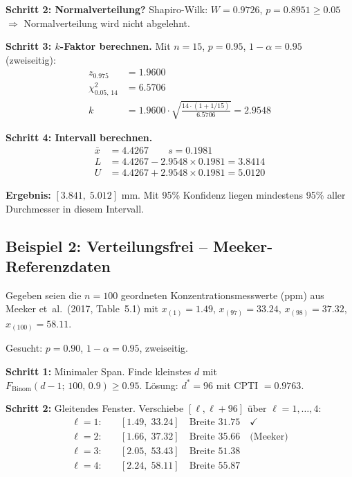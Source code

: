\documentclass[10pt,a4paper,twocolumn]{article}
\theoremstyle{definition}
\newcommand{\xbar}{\bar{x}}
\begin{document}
\textbf{Schritt 2: Normalverteilung?}
Shapiro-Wilk: $W = 0.9726$, $p = 0.8951 \geq 0.05$
$\Rightarrow$ Normalverteilung wird nicht abgelehnt.

\textbf{Schritt 3: $k$-Faktor berechnen.}
Mit $n = 15$, $p = 0.95$, $1-\alpha = 0.95$ (zweiseitig):
\begin{align*}
    z_{0.975} &= 1.9600 \\[2pt]
    \chi^2_{0.05,\,14} &= 6.5706 \\[2pt]
    k &= 1.9600 \cdot \sqrt{\frac{14 \cdot (1 + 1/15)}{6.5706}} = 2.9548
\end{align*}

\textbf{Schritt 4: Intervall berechnen.}
\begin{align*}
    \xbar &= 4.4267 \qquad s = 0.1981 \\[2pt]
    L &= 4.4267 - 2.9548 \times 0.1981 = 3.8414 \\
    U &= 4.4267 + 2.9548 \times 0.1981 = 5.0120
\end{align*}

\textbf{Ergebnis:} $[3.841,\; 5.012]$ mm.
Mit 95\% Konfidenz liegen mindestens 95\% aller Durchmesser
in diesem Intervall.

\subsection{Beispiel 2: Verteilungsfrei -- Meeker-Referenzdaten}

Gegeben seien die $n = 100$ geordneten Konzentrationsmesswerte (ppm)
aus Meeker et~al.\ (2017, Table~5.1) mit
$x_{(1)} = 1.49$, $x_{(97)} = 33.24$, $x_{(98)} = 37.32$,
$x_{(100)} = 58.11$.

Gesucht: $p = 0.90$, $1-\alpha = 0.95$, zweiseitig.

\textbf{Schritt 1:} Minimaler Span. Finde kleinstes $d$ mit
$F_{\text{Binom}}(d-1;\,100,\,0.9) \geq 0.95$.
Lösung: $d^* = 96$ mit CPTI $= 0.9763$.

\textbf{Schritt 2:} Gleitendes Fenster. Verschiebe $[\ell, \ell + 96]$
über $\ell = 1, \ldots, 4$:
\begin{align*}
    \ell=1: &\quad [1.49,\; 33.24] \quad\text{Breite } 31.75 \quad\checkmark \\
    \ell=2: &\quad [1.66,\; 37.32] \quad\text{Breite } 35.66 \quad\text{(Meeker)} \\
    \ell=3: &\quad [2.05,\; 53.43] \quad\text{Breite } 51.38 \\
    \ell=4: &\quad [2.24,\; 58.11] \quad\text{Breite } 55.87
\end{align*}
\end{document}
